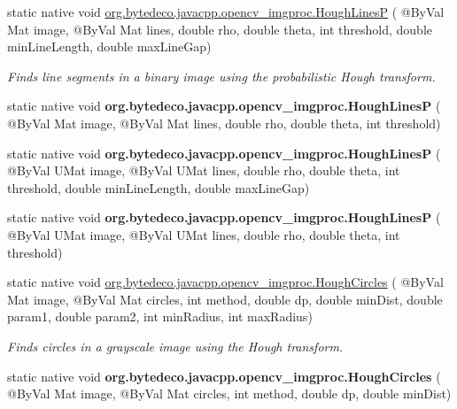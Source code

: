 \begin{DoxyCompactItemize}
\item 
static native void \hyperlink{group__imgproc__feature_gaac39ae22179f4396e7034f6d2a4cce1e}{org.\+bytedeco.\+javacpp.\+opencv\+\_\+imgproc.\+Hough\+LinesP} ( @By\+Val Mat image, @By\+Val Mat lines, double rho, double theta, int threshold, double min\+Line\+Length, double max\+Line\+Gap)
\begin{DoxyCompactList}\small\item\em Finds line segments in a binary image using the probabilistic Hough transform. \end{DoxyCompactList}\item 
\mbox{\label{group__imgproc__feature_ga8ae382715260ab4425f1ce1a63b121d0}} 
static native void {\bfseries org.\+bytedeco.\+javacpp.\+opencv\+\_\+imgproc.\+Hough\+LinesP} ( @By\+Val Mat image, @By\+Val Mat lines, double rho, double theta, int threshold)
\item 
\mbox{\label{group__imgproc__feature_ga57014edb8289247a7afc3a944a144656}} 
static native void {\bfseries org.\+bytedeco.\+javacpp.\+opencv\+\_\+imgproc.\+Hough\+LinesP} ( @By\+Val U\+Mat image, @By\+Val U\+Mat lines, double rho, double theta, int threshold, double min\+Line\+Length, double max\+Line\+Gap)
\item 
\mbox{\label{group__imgproc__feature_gada7af245d4c89baddda852e114d53588}} 
static native void {\bfseries org.\+bytedeco.\+javacpp.\+opencv\+\_\+imgproc.\+Hough\+LinesP} ( @By\+Val U\+Mat image, @By\+Val U\+Mat lines, double rho, double theta, int threshold)
\item 
static native void \hyperlink{group__imgproc__feature_ga600228eea1d6673137492fb0d0c1b8d5}{org.\+bytedeco.\+javacpp.\+opencv\+\_\+imgproc.\+Hough\+Circles} ( @By\+Val Mat image, @By\+Val Mat circles, int method, double dp, double min\+Dist, double param1, double param2, int min\+Radius, int max\+Radius)
\begin{DoxyCompactList}\small\item\em Finds circles in a grayscale image using the Hough transform. \end{DoxyCompactList}\item 
\mbox{\label{group__imgproc__feature_gad95610778f296561275a932b70bcbf4d}} 
static native void {\bfseries org.\+bytedeco.\+javacpp.\+opencv\+\_\+imgproc.\+Hough\+Circles} ( @By\+Val Mat image, @By\+Val Mat circles, int method, double dp, double min\+Dist)

\end{DoxyCompactItemize}

